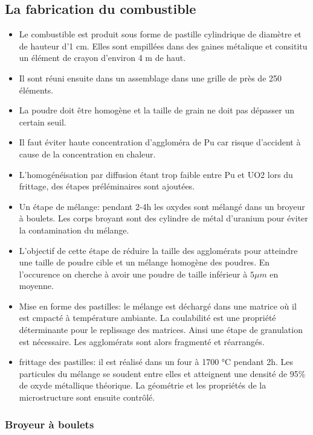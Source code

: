 \subsection{La fabrication du combustible}
\begin{itemize}
    \item Le combustible est produit sous forme de pastille cylindrique de diamètre et de hauteur d'1 cm. Elles sont empillées dans des gaines métalique et consititu un élément de crayon d'environ 4 m de haut.
    \item Il sont réuni ensuite dans un assemblage dans une grille de près de 250 éléments.
    \item La poudre doit être homogène et la taille de grain ne doit pas dépasser un certain seuil.
    \item Il faut éviter haute concentration d'aggloméra de Pu car risque d'accident à cause de la concentration en chaleur.
    \item L'homogénéisation par diffusion étant trop faible entre Pu et UO2 lors du frittage, des étapes préléminaires sont ajoutées.
    \item Un étape de mélange: pendant 2-4h les oxydes sont mélangé dans un broyeur à boulets. Les corps broyant sont des cylindre de métal d'uranium pour éviter la contamination du mélange.
    \item L'objectif de cette étape de réduire la taille des agglomérats pour atteindre une taille de poudre cible et un mélange homogène des poudres. En l'occurence on cherche à avoir une poudre de taille inférieur à $5\mu m$ en moyenne.
    \item Mise en forme des pastilles: le mélange est déchargé dans une matrice où il est cmpacté à température ambiante. La coulabilité est une propriété déterminante pour le replissage des matrices. Ainsi une étape de granulation est nécessaire. Les agglomérats sont alors fragmenté et réarrangés.
    \item frittage des pastilles: il est réalisé dans un four à 1700 °C pendant 2h. Les particules du mélange se soudent entre elles et atteignent une densité de 95\% de oxyde métallique théorique. La géométrie et les propriétés de la microstructure sont ensuite contrôlé.
\end{itemize}

\subsubsection{Broyeur à boulets}

